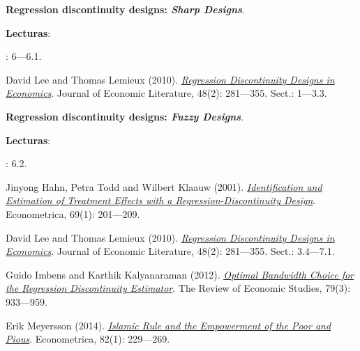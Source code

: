 \documentclass[letterpaper]{article}
\renewenvironment{itemize}{
  \begin{list}{}{
    \setlength{\leftmargin}{1.5em}
  }
}{
  \end{list}
}
\begin{document}
\begin{enumerate}[label=\roman*.]
          \begin{itemize} 
            \item[4.] {\bf Regression discontinuity designs: \emph{Sharp Designs}}.
                \begin{itemize} 
                \item[$\circ$] {\bf Lecturas}: 
                  \begin{itemize} 
                    \item[$\diamond$] \textcite{Angrist2009}: 6---6.1.
                     \item[$\diamond$] David Lee and Thomas Lemieux (2010). \href{https://github.com/hbahamonde/MLE/raw/master/Readings/Lee_RDD.pdf}{\emph{Regression Discontinuity Designs in Economics}}. Journal of Economic Literature, 48(2): 281---355. Sect.: 1---3.3.
                   \end{itemize}
                \end{itemize}
            \end{itemize}


            \begin{itemize} 
            \item[5.] {\bf Regression discontinuity designs: \emph{Fuzzy Designs}}.
                \begin{itemize} 
                \item[$\circ$] {\bf Lecturas}: 
                  \begin{itemize} 
                    \item[$\diamond$] \textcite{Angrist2009}: 6.2.
                    \item[$\diamond$] Jinyong Hahn, Petra Todd and Wilbert Klaauw (2001). \href{https://github.com/hbahamonde/MLE/raw/master/Readings/Hahn_RDD.pdf}{\emph{Identification and Estimation of Treatment Effects with a Regression-Discontinuity Design}}. Econometrica, 69(1): 201---209.
                    \item[$\diamond$] David Lee and Thomas Lemieux (2010). \href{https://github.com/hbahamonde/MLE/raw/master/Readings/Lee_RDD.pdf}{\emph{Regression Discontinuity Designs in Economics}}. Journal of Economic Literature, 48(2): 281---355. Sect.: 3.4---7.1.
                    \item[$\diamond$] Guido Imbens and Karthik Kalyanaraman (2012). \href{https://github.com/hbahamonde/MLE/raw/master/Readings/Imbens_Kalyanaraman.pdf}{\emph{Optimal Bandwidth Choice for the Regression Discontinuity Estimator}}. The Review of Economic Studies, 79(3): 933---959.
                    \item[$\diamond$] Erik Meyersson (2014). \href{https://github.com/hbahamonde/MLE/raw/master/Readings/Meyersson.pdf}{\emph{Islamic Rule and the Empowerment of the Poor and Pious}}. Econometrica, 82(1): 229---269.
                  \end{itemize}
                \end{itemize}
            \end{itemize}



\end{enumerate}
\end{document}
